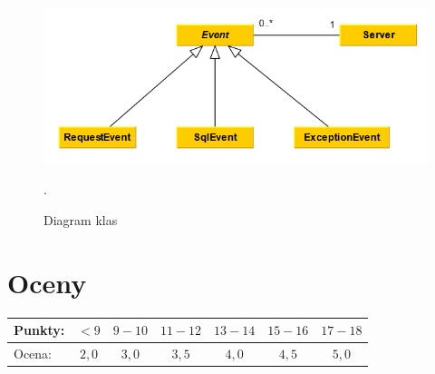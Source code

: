 \documentclass[12pt]{article}
\begin{document}
        \begin{figure}[ht]
            \centering
            \includegraphics{lista_4_class_diagram}
            \caption{Diagram klas}.
            \label{fig:class-diagram}
        \end{figure}




    \section*{Oceny}
    \begin{tabular}{|l|c|c|c|c|c|c|}
        \hline
        Punkty: & $<9$ & $9-10$ & $11-12$ & $13-14$ & $15-16$ & $17-18$\\
        \hline
        Ocena:  & $2,0$ & $3,0$ & $3,5$ & $4,0$ & $4,5$ & $5,0$\\
        \hline
    \end{tabular}
\end{document}
